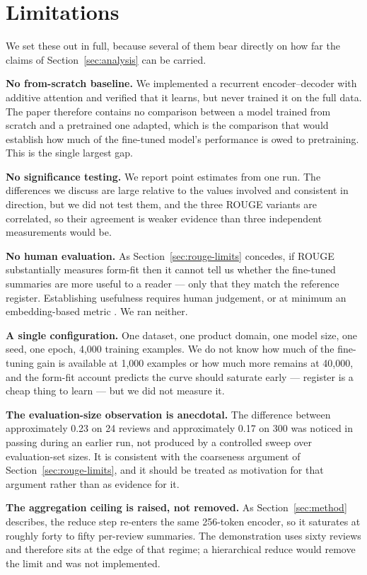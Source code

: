 \section{Limitations}
\label{sec:limitations}

We set these out in full, because several of them bear directly on how far the
claims of Section~\ref{sec:analysis} can be carried.

\textbf{No from-scratch baseline.} We implemented a recurrent encoder--decoder
with additive attention \cite{bahdanau2015attention} and verified that it
learns, but never trained it on the full data. The paper therefore contains no
comparison between a model trained from scratch and a pretrained one adapted,
which is the comparison that would establish how much of the fine-tuned model's
performance is owed to pretraining. This is the single largest gap.

\textbf{No significance testing.} We report point estimates from one run. The
differences we discuss are large relative to the values involved and consistent
in direction, but we did not test them, and the three ROUGE variants are
correlated, so their agreement is weaker evidence than three independent
measurements would be.

\textbf{No human evaluation.} As Section~\ref{sec:rouge-limits} concedes, if
ROUGE substantially measures form-fit then it cannot tell us whether the
fine-tuned summaries are more useful to a reader --- only that they match the
reference register. Establishing usefulness requires human judgement, or at
minimum an embedding-based metric \cite{zhang2020bertscore}. We ran neither.

\textbf{A single configuration.} One dataset, one product domain, one model
size, one seed, one epoch, 4{,}000 training examples. We do not know how much
of the fine-tuning gain is available at 1{,}000 examples or how much more
remains at 40{,}000, and the form-fit account predicts the curve should
saturate early --- register is a cheap thing to learn --- but we did not
measure it.

\textbf{The evaluation-size observation is anecdotal.} The difference between
approximately 0.23 on 24 reviews and approximately 0.17 on 300 was noticed in
passing during an earlier run, not produced by a controlled sweep over
evaluation-set sizes. It is consistent with the
coarseness argument of Section~\ref{sec:rouge-limits}, and it should be treated
as motivation for that argument rather than as evidence for it.

\textbf{The aggregation ceiling is raised, not removed.} As
Section~\ref{sec:method} describes, the reduce step re-enters the same
256-token encoder, so it saturates at roughly forty to fifty per-review
summaries. The demonstration uses sixty reviews and therefore sits at the edge
of that regime; a hierarchical reduce would remove the limit and was not
implemented.

